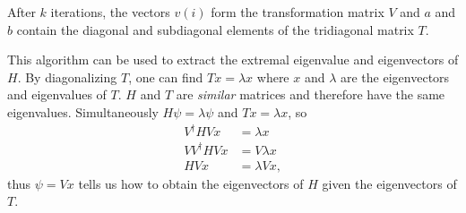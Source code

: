 After $k$ iterations, the vectors $v(i)$ form the transformation matrix $V$ and
$a$ and $b$ contain the diagonal and subdiagonal elements of the tridiagonal 
matrix $T$.  

This algorithm can be used to extract the extremal eigenvalue and eigenvectors 
of $H$. By diagonalizing $T$, one can find $Tx = \lambda x$ where $x$ and $\lambda$
are the eigenvectors and eigenvalues of $T$. $H$ and $T$ are \textit{similar} matrices
and therefore have the same eigenvalues. Simultaneously $H\psi = \lambda \psi$ and 
$Tx = \lambda x$, so
\begin{equation}\begin{split}
    V^\dagger H Vx &= \lambda x \\
    VV^\dagger H Vx &= V\lambda x \\
    H Vx &= \lambda Vx, 
\end{split}\end{equation}
thus $\psi = Vx$ tells us how to obtain the eigenvectors of $H$ given the 
eigenvectors of $T$.

